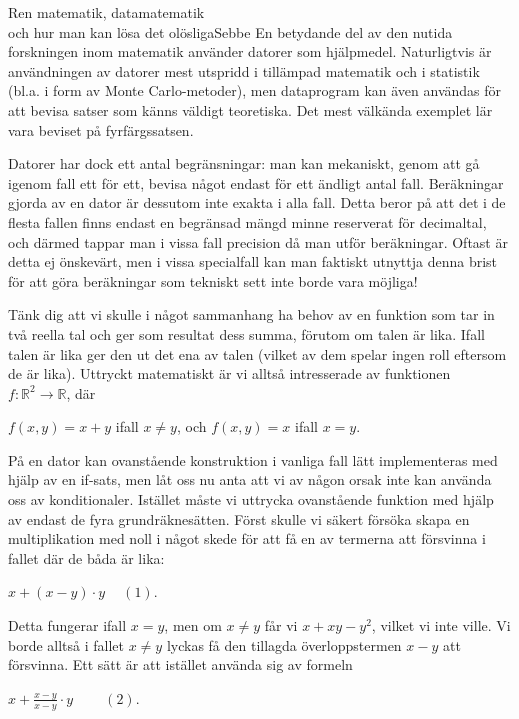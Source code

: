 \documentclass{spektraklet}
\begin{document}
\begin{artikel}{Ren matematik, datamatematik \\ och hur man kan lösa det olösliga}{Sebbe}
  En betydande del av den nutida forskningen inom matematik använder datorer som hjälpmedel. Naturligtvis är användningen av datorer mest utspridd i tillämpad matematik och i statistik (bl.a. i form av Monte Carlo-metoder), men dataprogram kan även användas för att bevisa satser som känns väldigt teoretiska. Det mest välkända exemplet lär vara beviset på fyrfärgssatsen.

Datorer har dock ett antal begränsningar: man kan mekaniskt, genom att gå igenom fall ett för ett, bevisa något endast för ett ändligt antal fall. Beräkningar gjorda av en dator är dessutom inte exakta i alla fall. Detta beror på att det i de flesta fallen finns endast en begränsad mängd minne reserverat för decimaltal, och därmed tappar man i vissa fall precision då man utför beräkningar. Oftast är detta ej önskevärt, men i vissa specialfall kan man faktiskt utnyttja denna brist för att göra beräkningar som tekniskt sett inte borde vara möjliga!

Tänk dig att vi skulle i något sammanhang ha behov av en funktion som tar in två reella tal och ger som resultat dess summa, förutom om talen är lika. Ifall talen är lika ger den ut det ena av talen (vilket av dem spelar ingen roll eftersom de är lika). Uttryckt matematiskt är vi alltså intresserade av funktionen $f\colon \mathbb{R}^2 \rightarrow \mathbb{R}$, där

    $f(x, y) = x + y$ ifall $ x \neq y$, och
    $f(x, y) = x$ ifall $ x = y$.

På en dator kan ovanstående konstruktion i vanliga fall lätt implementeras med hjälp av en if-sats, men låt oss nu anta att vi av någon orsak inte kan använda oss av konditionaler. Istället måste vi uttrycka ovanstående funktion med hjälp av endast de fyra grundräknesätten. Först skulle vi säkert försöka skapa en multiplikation med noll i något skede för att få en av termerna att försvinna i fallet där de båda är lika:

$ x + (x-y)\cdot y \quad \: (1)$.

Detta fungerar ifall $ x = y$, men om $ x \neq y$ får vi $ x + xy - y^2$, vilket vi inte ville. Vi borde alltså i fallet $ x \neq y$ lyckas få den tillagda överloppstermen $ x-y$ att försvinna. Ett sätt är att istället använda sig av formeln

$ x + \frac{x-y}{x-y} \cdot y \qquad \: (2)$.


\end{artikel}
\end{document}
